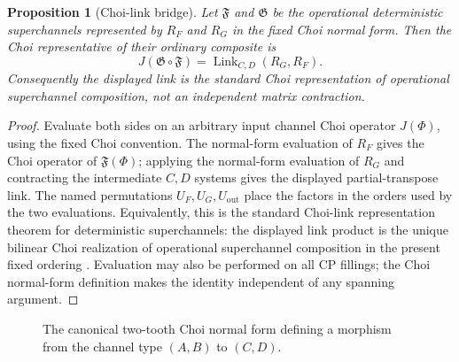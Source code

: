 \documentclass[11pt,a4paper]{article}
\theoremstyle{definition}
\theoremstyle{plain}
\newtheorem{proposition}[theorem]{Proposition}
\theoremstyle{remark}
\begin{document}
\begin{proposition}[Choi-link bridge]
Let $\mathfrak F$ and $\mathfrak G$ be the operational deterministic
superchannels represented by $R_F$ and $R_G$ in the fixed Choi normal
form. Then the Choi representative of their ordinary composite is
\[
J(\mathfrak G\circ\mathfrak F)
=\operatorname{Link}_{C,D}(R_G,R_F).
\]
Consequently the displayed link is the standard Choi representation of
operational superchannel composition, not an independent matrix
contraction.
\end{proposition}
\begin{proof}
Evaluate both sides on an arbitrary input channel Choi operator
$J(\Phi)$, using the fixed Choi convention. The normal-form evaluation
of $R_F$ gives the Choi operator of $\mathfrak F(\Phi)$; applying the
normal-form evaluation of $R_G$ and contracting the intermediate $C,D$
systems gives the displayed partial-transpose link. The named
permutations $U_F,U_G,U_{\mathrm{out}}$ place the factors in the
orders used by the two evaluations. Equivalently, this is the standard Choi-link representation theorem for
deterministic superchannels: the displayed link product is the unique
bilinear Choi realization of operational superchannel composition in the
present fixed ordering \cite{chiribella2009,chiribella2013}. Evaluation may
also be performed on all CP fillings; the Choi normal-form
definition makes the identity independent of any spanning argument.
\end{proof}

\begin{figure}[ht]
\centering
{}
\caption{The canonical two-tooth Choi normal form defining a morphism from the channel type $(A,B)$ to $(C,D)$.}
\label{fig:SDet-body}
\end{figure}
\end{document}
